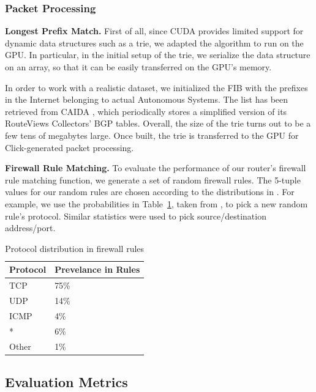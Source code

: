 \subsubsection{Packet Processing}
\label{sec:eval-proc}

\noindent \textbf{Longest Prefix Match.} First of all, since CUDA provides limited support for dynamic data structures such as a trie, we adapted the algorithm to run on the GPU. In particular, in the initial setup of the trie, we serialize the data structure on an array, so that it can be easily transferred on the GPU's memory.

In order to work with a realistic dataset, we initialized the FIB with the prefixes in the Internet belonging to actual Autonomous Systems. The list has been retrieved from CAIDA \cite{routeviews}, which periodically stores a simplified version of its RouteViews Collectors' BGP tables. Overall, the size of the trie turns out to be a few tens of megabytes large. Once built, the trie is transferred to the GPU for Click-generated packet processing.


\noindent \textbf{Firewall Rule Matching.} To evaluate the performance of our
router's firewall rule matching function, we generate a set of random firewall
rules. The 5-tuple values for our random rules are chosen according to the
distributions in \cite{Rovniagin}. For example, we use the probabilities in
Table~\ref{tab:proto-dist}, taken from \cite{Rovniagin}, to pick a new random
rule's protocol. Similar statistics were used to pick source/destination
address/port.

\begin{table}[htbp]
   \centering
   \begin{tabular}{ l l } 
      \toprule
      \textbf{Protocol}  & \textbf{Prevelance in Rules} \\
      \midrule
	  TCP & 75\% \\
      UDP & 14\% \\
	  ICMP & 4\% \\
	  * & 6\% \\
	  Other & 1\% \\
      \bottomrule
   \end{tabular}
   \caption{Protocol distribution in firewall rules}
   \label{tab:proto-dist}
\end{table}

\subsection{Evaluation Metrics}
\label{sec:metrics}

